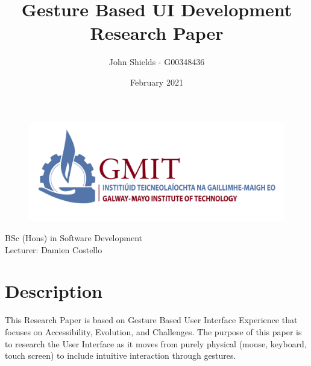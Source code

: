 \documentclass{article}
\title{\huge{\textbf{Gesture Based UI Development}} \\
\LARGE{Research Paper}}
\author{John Shields - G00348436}
\date{February 2021}
\begin{document}
\clearpage\maketitle
\thispagestyle{empty}
\begin{center}
    \begin{figure}[h]
        \centering
        \includegraphics[width=15cm]{pics/logo-gmit.png}
        \label{fig:logo}
    \end{figure}
    \large{	BSc (Hons) in Software Development \\
    Lecturer: Damien Costello}
\end{center}
\newpage
\setcounter{page}{1}
\tableofcontents
\listoffigures

\newpage
{} %

\section{Description}
This Research Paper is based on Gesture Based User Interface Experience that focuses on Accessibility, Evolution, and Challenges. The purpose of this paper is to research the User Interface as it moves from purely physical (mouse, keyboard, touch screen) to include intuitive interaction through gestures.
\end{document}
